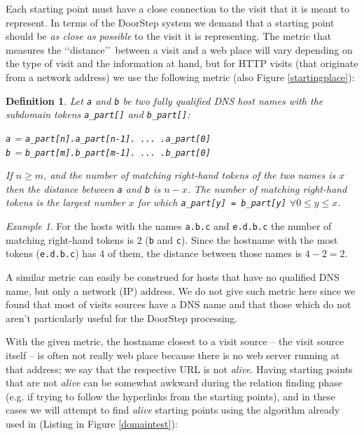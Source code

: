 \documentclass[a4paper]{danarticle}
\newtheorem{definition}{Definition}
\theoremstyle{remark}
\newtheorem*{example}{Example}
\begin{document}
       Each starting point must have a close connection to the visit that it is
       meant to represent. In terms of the DoorStep system we demand that a
       starting point should be \textit{as close as possible} to the visit it is
       representing. The metric that measures the \lq\lq distance\rq\rq\ between
       a visit and a web place will vary depending on the type of visit and the
       information at hand, but for HTTP visits (that originate from a network
       address) we use the following metric (also Figure \ref{startingplace}):
       \begin{definition}
       \label{metric}
       Let \verb$a$ and \verb$b$ be two fully qualified DNS host names with the
       subdomain tokens \verb$a_part[]$ and \verb$b_part[]$:
       \begin{center}
        \verb$a$ = \verb$a_part[n].a_part[n-1]. ... .a_part[0]$\\
        \verb$b$ = \verb$b_part[m].b_part[m-1]. ... .b_part[0]$\\ 
       \end{center}
       If $ n \geq m $, and the number of matching right-hand tokens of the two
       names is $ x $ then the distance between \verb$a$ and \verb$b$ is 
       $ n - x $. The number of matching right-hand tokens is the largest number
       $ x $ for which \verb$a_part[y] = b_part[y]$ $ \forall 0 \leq y \leq x $.
       \end{definition}
       \begin{example}
       For the hosts with the names \verb$a.b.c$ and \verb$e.d.b.c$  the number
       of matching right-hand tokens is 2 (\verb$b$ and \verb$c$). Since the
       hostname with the most tokens (\verb$e.d.b.c$) has 4 of them, the distance
       between those names is $ 4 - 2 = 2 $.
       \end{example}
       A similar metric can easily be construed for hosts that have no
       qualified DNS name, but only a network (IP) address. We do not give such
       metric here since we found that most of visits sources have a DNS name
       and that those which do not aren't particularly useful for the DoorStep
       processing.
       
       With the given metric, the hostname closest to a
       visit source -- the visit source itself -- 
       is often not really web place because there is no web server
       running at that address; we say that the respective URL is not
       \textit{alive}. Having starting points that are not \textit{alive} can
       be somewhat awkward during the relation finding phase (e.g. if trying to
       follow the hyperlinks from the starting points), and in these cases we
       will attempt to find \textit{alive} starting points using the algorithm
       already used in \cite{webaware} (Listing in Figure \ref{domaintest}):
       
\end{document}
